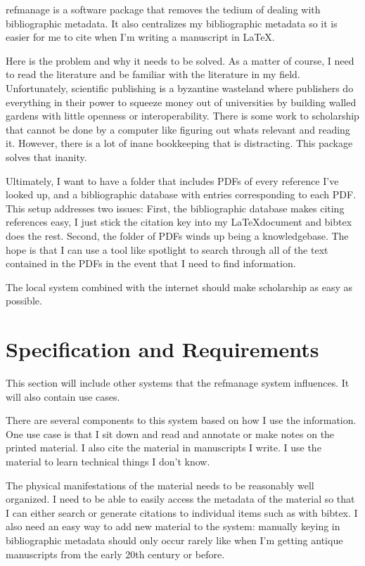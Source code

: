 \documentclass[letterpaper,12pt]{article}
\begin{document}
refmanage is a software package that removes the tedium of dealing with bibliographic metadata. It also centralizes my bibliographic metadata so it is easier for me to cite when I'm writing a manuscript in \LaTeX.

Here is the problem and why it needs to be solved. As a matter of course, I need to read the literature and be familiar with the literature in my field. Unfortunately, scientific publishing is a byzantine wasteland where publishers do everything in their power to squeeze money out of universities by building walled gardens with little openness or interoperability. There is some work to scholarship that cannot be done by a computer like figuring out whats relevant and reading it. However, there is a lot of inane bookkeeping that is distracting. This package solves that inanity.

Ultimately, I want to have a folder that includes PDFs of every reference I've looked up, and a bibliographic database with entries corresponding to each PDF. This setup addresses two issues: First, the bibliographic database makes citing references easy, I just stick the citation key into my \LaTeX document and bibtex does the rest. Second, the folder of PDFs winds up being a knowledgebase. The hope is that I can use a tool like spotlight to search through all of the text contained in the PDFs in the event that I need to find information.

The local system combined with the internet should make scholarship as easy as possible.








\section{Specification and Requirements}
This section will include other systems that the refmanage system influences. It will also contain use cases.

There are several components to this system based on how I use the information. One use case is that I sit down and read and annotate or make notes on the printed material. I also cite the material in manuscripts I write. I use the material to learn technical things I don't know.

The physical manifestations of the material needs to be reasonably well organized. I need to be able to easily access the metadata of the material so that I can either search or generate citations to individual items such as with bibtex. I also need an easy way to add new material to the system: manually keying in bibliographic metadata should only occur rarely like when I'm getting antique manuscripts from the early 20th century or before.
\end{document}
